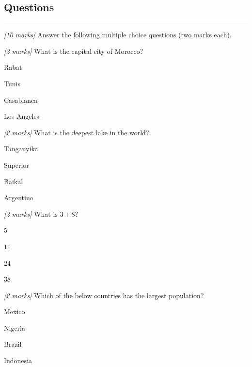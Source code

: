\documentclass{article}\usepackage[]{graphicx}\usepackage[]{xcolor}
\newif \ifmemo
\newif\ifnotmemo
\begin{document}
\renewcommand{\arraystretch}{1.0}
\newpage
\fi

\subsection*{Questions}
\vspace{-0.5cm}
\rule{15cm}{0.01cm}

\ifnotmemo\large\fi

\beq

\item \textit{[10 marks]} Answer the following multiple choice questions (two marks each).

\beq

  \item \textit{[2 marks]} What is the capital city of Morocco?

  \beq
    \item Rabat \ifmemo\textcolor{red}{Correct \tick \tick}\fi
   \item Tunis 
  \item Casablanca
  \item Los Angeles
  \eeq

  \item \textit{[2 marks]} What is the deepest lake in the world?

  \beq
  \item Tanganyika 
    \item Superior
  \item Baikal \ifmemo\textcolor{red}{Correct \tick \tick}\fi
   \item Argentino
  \eeq

  \item \textit{[2 marks]} What is $3+8$?

  \beq
    \item $5$
  \item $11$ \ifmemo\textcolor{red}{Correct \tick \tick}\fi
  \item $24$
   \item $38$
  \eeq

  \item \textit{[2 marks]} Which of the below countries has the largest population?

  \beq
  \item Mexico    
  
  \item Nigeria
  
   \item Brazil
   
   \item Indonesia \ifmemo\textcolor{red}{Correct \tick \tick}\fi
  \eeq
\end{document}
